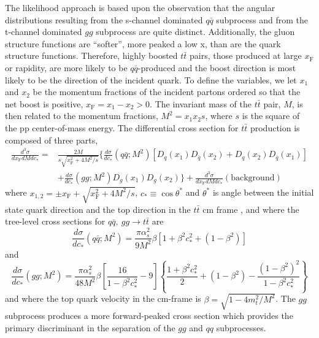 \documentclass{cmspaperpdf}
\begin{document}
The likelihood approach is based upon the observation that the angular distributions resulting from the s-channel dominated $q\bar q$ subprocess and from the t-channel dominated $gg$ subprocess are quite distinct.  Additionally, the gluon structure functions are ``softer'', more peaked a low x, than are the quark structure functions.  Therefore, highly boosted $t\bar t$ pairs, those produced at large $x_\mathrm{F}$ or rapidity, are more likely to be $q\bar q$-produced and the boost direction is most likely to be the direction of the incident quark.  To define the variables, we let $x_1$ and $x_2$ be the momentum fractions of the incident partons ordered so that the net boost is positive, $x_\mathrm{F}=x_1-x_2>0$.  The invariant mass of the $t\bar t$ pair, $M$, is then related to the momentum fractions, $M^2 = x_1x_2s$, where $s$ is the square of the pp center-of-mass energy. The differential cross section for $t\bar t$ production is composed of three parts,
\begin{align}
\frac{d^3\sigma}{dx_\mathrm{F}dMdc_*} =&\frac{2M}{s\sqrt{x_\mathrm{F}^2+4M^2/s}}\biggl\lbrace\frac{d\sigma}{dc_*}(q\bar q;M^2)\left[D_q(x_1)D_{\bar q}(x_2)+D_q(x_2)D_{\bar q}(x_1)\right] \nonumber \\ &+ \frac{d\sigma}{dc_*}(gg;M^2)D_g(x_1)D_g(x_2)\biggr\rbrace + \frac{d^3\sigma}{dx_\mathrm{F}dMdc_*}(\mathrm{background})
\label{eq:totxsdef}
\end{align}
where $x_{1,2}=\pm x_\mathrm{F}+ \sqrt{x_\mathrm{F}^2+4M^2/s}$, $c_*\equiv\cos{\theta^*}$ and $\theta^*$ is angle between the initial state quark direction and the top direction in the $t\bar t$ cm frame , and where the tree-level cross sections for $q\bar q,\ gg \to t\bar t$ are
\begin{equation}
\frac{d\sigma}{dc_*}(q\bar q;M^2) = \frac{\pi\alpha_s^2}{9M^2}\beta\left[1+\beta^2c_*^2+\left(1-\beta^2\right)\right]
\label{eq:qqzerodef}
\end{equation}
and
\begin{equation}
\frac{d\sigma}{dc_*}(gg;M^2) = \frac{\pi\alpha_s^2}{48M^2}\beta\left[\frac{16}{1-\beta^2c_*^2}-9\right]\left\lbrace\frac{1+\beta^2c_*^2}{2}+(1-\beta^2)-\frac{(1-\beta^2)^2}{1-\beta^2c_*^2}\right\rbrace
\label{eq:ggdef}
\end{equation}
and where the top quark velocity in the cm-frame is $\beta=\sqrt{1-4m_t^2/M^2}$.  The $gg$ subprocess produces a more forward-peaked cross section which provides the primary discriminant in the separation of the $gg$ and $qq$ subprocesses.
\end{document}
